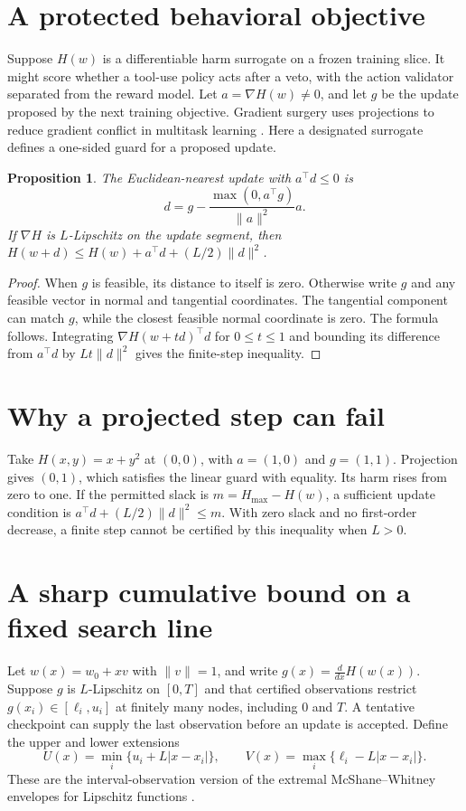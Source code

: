 \documentclass[11pt]{article}
\newtheorem{proposition}{Proposition}
\begin{document}
\section{A protected behavioral objective}
Suppose $H(w)$ is a differentiable harm surrogate on a frozen
training slice. It might score whether a tool-use policy acts after
a veto, with the action validator separated from the reward model.
Let $a=\nabla H(w)\neq0$, and let $g$ be the update proposed by the
next training objective. Gradient surgery uses projections to
reduce gradient conflict in multitask learning \cite{pcgrad}.
Here a designated surrogate defines a one-sided guard for a
proposed update.
\begin{proposition}
The Euclidean-nearest update with $a^\top d\leq0$ is
\[
d=g-\frac{\max(0,a^\top g)}{\lVert a\rVert^2}a.
\]
If $\nabla H$ is $L$-Lipschitz on the update segment, then
$H(w+d)\leq H(w)+a^\top d+(L/2)\lVert d\rVert^2$.
\end{proposition}
\begin{proof}
When $g$ is feasible, its distance to itself is zero. Otherwise
write $g$ and any feasible vector in normal and tangential
coordinates. The tangential component can match $g$, while the
closest feasible normal coordinate is zero. The formula follows.
Integrating $\nabla H(w+td)^\top d$ for $0\leq t\leq1$ and
bounding its difference from $a^\top d$ by $Lt\lVert d\rVert^2$
gives the finite-step inequality.
\end{proof}

\section{Why a projected step can fail}
Take $H(x,y)=x+y^2$ at $(0,0)$, with $a=(1,0)$ and $g=(1,1)$.
Projection gives $(0,1)$, which satisfies the linear guard
with equality. Its harm rises from zero to one. If the permitted
slack is $m=H_{\max}-H(w)$, a sufficient update condition is
$a^\top d+(L/2)\lVert d\rVert^2\leq m$. With zero slack and no
first-order decrease, a finite step cannot be certified by this
inequality when $L>0$.

\section{A sharp cumulative bound on a fixed search line}
Let $w(x)=w_0+xv$ with $\lVert v\rVert=1$, and write
$g(x)=\frac{d}{dx}H(w(x))$. Suppose $g$ is $L$-Lipschitz
on $[0,T]$ and that certified observations restrict
$g(x_i)\in[\ell_i,u_i]$ at finitely many nodes, including
$0$ and $T$. A tentative checkpoint can supply the last
observation before an update is accepted.
Define the upper and lower extensions
\[
 U(x)=\min_i\{u_i+L|x-x_i|\},\qquad
 V(x)=\max_i\{\ell_i-L|x-x_i|\}.
\]
These are the interval-observation version of the extremal
McShane--Whitney envelopes for Lipschitz functions
\cite{petrakis}.
\end{document}
